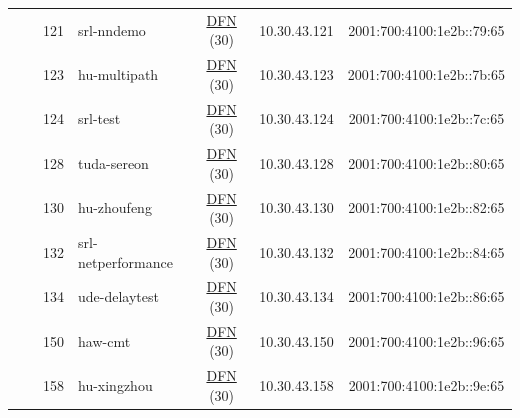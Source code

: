 \begin{small}
\begin{center}
\begin{longtable}{|c|c|c|c|c|c|c|c|}
  &  & \tiny{121} & \multicolumn{1}{|l|}{\tiny{srl-nndemo}} & \multicolumn{2}{|c|}{\tiny{\href{https://www.dfn.de}{DFN} (30)}} & \tiny{10.30.43.121} & \tiny{2001:700:4100:1e2b::79:65} \\* \cline{3-3}\cline{4-4}\cline{5-5}\cline{6-6}\cline{7-7}\cline{8-8}
  &  & \tiny{123} & \multicolumn{1}{|l|}{\tiny{hu-multipath}} & \multicolumn{2}{|c|}{\tiny{\href{https://www.dfn.de}{DFN} (30)}} & \tiny{10.30.43.123} & \tiny{2001:700:4100:1e2b::7b:65} \\* \cline{3-3}\cline{4-4}\cline{5-5}\cline{6-6}\cline{7-7}\cline{8-8}
  &  & \tiny{124} & \multicolumn{1}{|l|}{\tiny{srl-test}} & \multicolumn{2}{|c|}{\tiny{\href{https://www.dfn.de}{DFN} (30)}} & \tiny{10.30.43.124} & \tiny{2001:700:4100:1e2b::7c:65} \\* \cline{3-3}\cline{4-4}\cline{5-5}\cline{6-6}\cline{7-7}\cline{8-8}
  &  & \tiny{128} & \multicolumn{1}{|l|}{\tiny{tuda-sereon}} & \multicolumn{2}{|c|}{\tiny{\href{https://www.dfn.de}{DFN} (30)}} & \tiny{10.30.43.128} & \tiny{2001:700:4100:1e2b::80:65} \\* \cline{3-3}\cline{4-4}\cline{5-5}\cline{6-6}\cline{7-7}\cline{8-8}
  &  & \tiny{130} & \multicolumn{1}{|l|}{\tiny{hu-zhoufeng}} & \multicolumn{2}{|c|}{\tiny{\href{https://www.dfn.de}{DFN} (30)}} & \tiny{10.30.43.130} & \tiny{2001:700:4100:1e2b::82:65} \\* \cline{3-3}\cline{4-4}\cline{5-5}\cline{6-6}\cline{7-7}\cline{8-8}
  &  & \tiny{132} & \multicolumn{1}{|l|}{\tiny{srl-netperformance}} & \multicolumn{2}{|c|}{\tiny{\href{https://www.dfn.de}{DFN} (30)}} & \tiny{10.30.43.132} & \tiny{2001:700:4100:1e2b::84:65} \\* \cline{3-3}\cline{4-4}\cline{5-5}\cline{6-6}\cline{7-7}\cline{8-8}
  &  & \tiny{134} & \multicolumn{1}{|l|}{\tiny{ude-delaytest}} & \multicolumn{2}{|c|}{\tiny{\href{https://www.dfn.de}{DFN} (30)}} & \tiny{10.30.43.134} & \tiny{2001:700:4100:1e2b::86:65} \\* \cline{3-3}\cline{4-4}\cline{5-5}\cline{6-6}\cline{7-7}\cline{8-8}
  &  & \tiny{150} & \multicolumn{1}{|l|}{\tiny{haw-cmt}} & \multicolumn{2}{|c|}{\tiny{\href{https://www.dfn.de}{DFN} (30)}} & \tiny{10.30.43.150} & \tiny{2001:700:4100:1e2b::96:65} \\* \cline{3-3}\cline{4-4}\cline{5-5}\cline{6-6}\cline{7-7}\cline{8-8}
  &  & \tiny{158} & \multicolumn{1}{|l|}{\tiny{hu-xingzhou}} & \multicolumn{2}{|c|}{\tiny{\href{https://www.dfn.de}{DFN} (30)}} & \tiny{10.30.43.158} & \tiny{2001:700:4100:1e2b::9e:65} \\* \cline{3-3}\cline{4-4}\cline{5-5}\cline{6-6}\cline{7-7}\cline{8-8}

\end{longtable}
\end{center}
\end{small}
